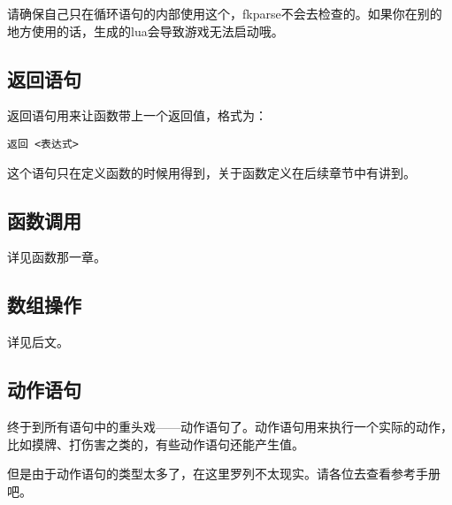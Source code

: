 请确保自己只在循环语句的内部使用这个，fkparse不会去检查的。如果你在别的地方使用的话，生成的lua会导致游戏无法启动哦。

\subsection{返回语句}

返回语句用来让函数带上一个返回值，格式为：

\begin{verbatim}
返回 <表达式>
\end{verbatim}

这个语句只在定义函数的时候用得到，关于函数定义在后续章节中有讲到。

\subsection{函数调用}

详见函数那一章。

\subsection{数组操作}

详见后文。

\subsection{动作语句}

终于到所有语句中的重头戏——动作语句了。动作语句用来执行一个实际的动作，比如摸牌、打伤害之类的，有些动作语句还能产生值。

但是由于动作语句的类型太多了，在这里罗列不太现实。请各位去查看参考手册吧。

